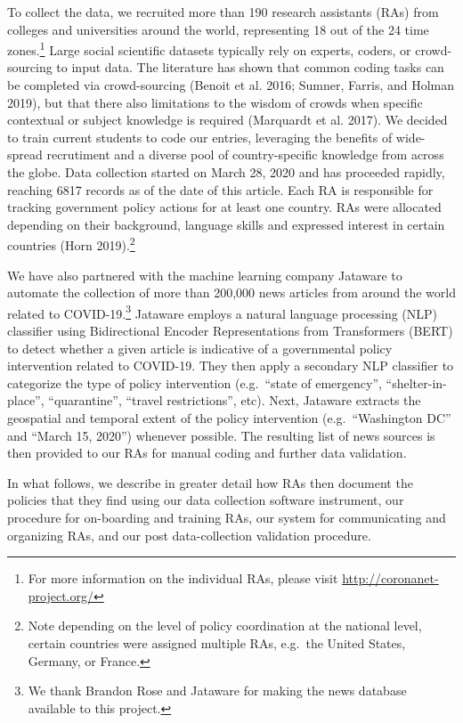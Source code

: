 \documentclass[]{article}
\let\rmarkdownfootnote\footnote%
\def\footnote{\protect\rmarkdownfootnote}
\begin{document}
To collect the data, we recruited more than 190 research assistants (RAs) from colleges and universities around the world, representing 18 out of the 24 time zones.\footnote{For more information on the individual RAs, please visit \url{http://coronanet-project.org/}} Large social scientific datasets typically rely on experts, coders, or crowd-sourcing to input data. The literature has shown that common coding tasks can be completed via crowd-sourcing (Benoit et al. 2016; Sumner, Farris, and Holman 2019), but that there also limitations to the wisdom of crowds when specific contextual or subject knowledge is required (Marquardt et al. 2017). We decided to train current students to code our entries, leveraging the benefits of wide-spread recrutiment and a diverse pool of country-specific knowledge from across the globe. Data collection started on March 28, 2020 and has proceeded rapidly, reaching 6817 records as of the date of this article. Each RA is responsible for tracking government policy actions for at least one country. RAs were allocated depending on their background, language skills and expressed interest in certain countries (Horn 2019).\footnote{Note depending on the level of policy coordination at the national level, certain countries were assigned multiple RAs, e.g.~the United States, Germany, or France.}

We have also partnered with the machine learning company Jataware to automate the collection of more than 200,000 news articles from around the world related to COVID-19.\footnote{We thank Brandon Rose and Jataware for making the news database available to this project.} Jataware employs a natural language processing (NLP) classifier using Bidirectional Encoder Representations from Transformers (BERT) to detect whether a given article is indicative of a governmental policy intervention related to COVID-19. They then apply a secondary NLP classifier to categorize the type of policy intervention (e.g.~``state of emergency'', ``shelter-in-place'', ``quarantine'', ``travel restrictions'', etc). Next, Jataware extracts the geospatial and temporal extent of the policy intervention (e.g.~``Washington DC'' and ``March 15, 2020'') whenever possible. The resulting list of news sources is then provided to our RAs for manual coding and further data validation.

In what follows, we describe in greater detail how RAs then document the policies that they find using our data collection software instrument, our procedure for on-boarding and training RAs, our system for communicating and organizing RAs, and our post data-collection validation procedure.
\end{document}

